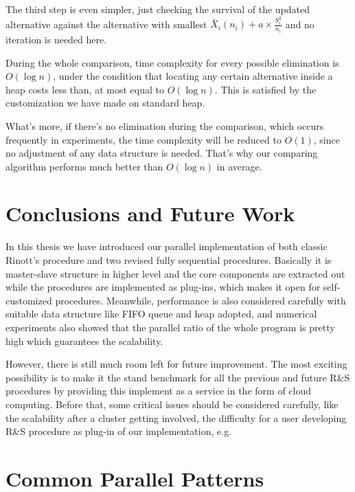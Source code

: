 \documentclass[12pt,a4paper]{report}
\begin{document}
The third step is even simpler, just checking the survival of the updated alternative against the alternative with smallest $\bar{X}_i(n_i) + a \times \frac{S_i^2}{n_i}$ and no iteration is needed here.

During the whole comparison, time complexity for every possible elimination is $O(\log n)$, under the condition that locating any certain alternative inside a heap costs less than, at most equal to $O(\log n)$. This is satisfied by the customization we have made on standard heap.

What's more, if there's no elimination during the comparison, which occurs frequently in experiments, the time complexity will be reduced to $O(1)$, since no adjustment of any data structure is needed. That's why our comparing algorithm performs much better than $O(\log n)$ in average.

\chapter{Conclusions and Future Work}

In this thesis we have introduced our parallel implementation of both classic Rinott's procedure and two revised fully sequential procedures. Basically it is master-slave structure in higher level and the core components are extracted out while the procedures are implemented as plug-ins, which makes it open for self-customized procedures. Meanwhile, performance is also considered carefully with suitable data structure like FIFO queue and heap adopted, and numerical experiments also showed that the parallel ratio of the whole program is pretty high which guarantees the scalability.

However, there is still much room left for future improvement. The most exciting possibility is to make it the stand benchmark for all the previous and future R\&S procedures by providing this implement as a service in the form of cloud computing. Before that, some critical issues should be considered carefully, like the scalability after a cluster getting involved, the difficulty for a user developing R\&S procedure as plug-in of our implementation, e.g.

\newpage
{}
\appendix

\chapter{Common Parallel Patterns}
\end{document}
